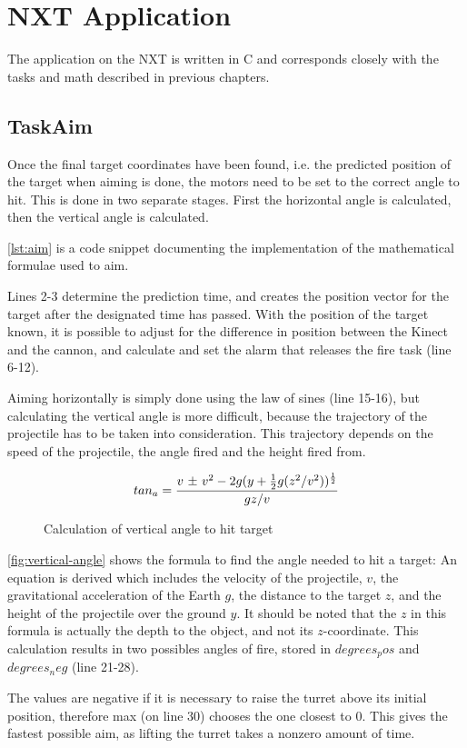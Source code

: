 \section{NXT Application}
The application on the NXT is written in C and corresponds closely with the tasks and math described in previous chapters.

\subsection{TaskAim}
Once the final target coordinates have been found, i.e. the predicted position of the target when aiming is done, the motors need to be set to the correct angle to hit. This is done in two separate stages. First the horizontal angle is calculated, then the vertical angle is calculated.

\autoref{lst:aim} is a code snippet documenting the implementation of the mathematical formulae used to aim.


Lines 2-3 determine the prediction time, and creates the position vector for the target after the designated
time has passed. With the position of the target known, it is possible to adjust for the difference in position 
between the Kinect and the cannon, and calculate and set the alarm that releases the fire task (line 6-12).

Aiming horizontally is simply done using the law of sines (line 15-16), but calculating the vertical angle is more difficult, because the trajectory of the projectile has to be taken into consideration. This trajectory depends on the speed of the projectile, the angle fired and the height fired from.

\begin{figure}[htbp]
$$tan_a = {v \text{ \textpm} \text{ } v^2 - 2g(y + {1 \over 2}g(z^2/v^2))^{1 \over 2} \over gz/v}$$
\caption{Calculation of vertical angle to hit target}
\label{fig:vertical-angle}
\end{figure}

\autoref{fig:vertical-angle} shows the formula to find the angle needed to hit a target: An equation is derived which  
includes the velocity of the projectile, $v$, the gravitational acceleration of the Earth $g$, the distance to the
target $z$, and the height of the projectile over the ground $y$. It should be noted that the $z$ in this formula
is actually the depth to the object, and not its $z$-coordinate. This calculation results in two possibles angles
of fire, stored in $degrees_pos$ and $degrees_neg$ (line 21-28).

The values are negative if it is necessary to raise the turret above its initial position, therefore max (on line 30)
chooses the one closest to 0\textdegree . This gives the fastest possible aim, as lifting the turret takes a nonzero
amount of time.
